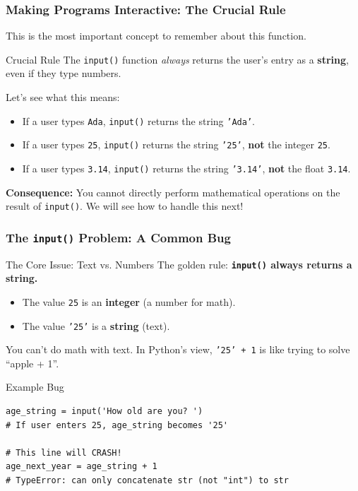 \documentclass{beamer}
\begin{document}
\begin{frame}[fragile]
    \frametitle{Making Programs Interactive: The Crucial Rule}

    This is the most important concept to remember about this function.

    \begin{alertblock}{Crucial Rule}
        The \texttt{input()} function \textit{always} returns the user's entry as a \textbf{string}, even if they type numbers.
    \end{alertblock}

    \vspace{1em}

    Let's see what this means:
    \begin{itemize}
        \item If a user types \texttt{Ada}, \texttt{input()} returns the string \texttt{'Ada'}.
        \item If a user types \texttt{25}, \texttt{input()} returns the string \texttt{'25'}, \textbf{not} the integer \texttt{25}.
        \item If a user types \texttt{3.14}, \texttt{input()} returns the string \texttt{'3.14'}, \textbf{not} the float \texttt{3.14}.
    \end{itemize}

    \vspace{1em}
    \textbf{Consequence:} You cannot directly perform mathematical operations on the result of \texttt{input()}. We will see how to handle this next!

\end{frame}

\begin{frame}[fragile]
    \frametitle{The \texttt{input()} Problem: A Common Bug}
    
    \begin{block}{The Core Issue: Text vs. Numbers}
        The golden rule: \textbf{\texttt{input()} always returns a string.}
        \begin{itemize}
            \item The value \texttt{25} is an \textbf{integer} (a number for math).
            \item The value \texttt{'25'} is a \textbf{string} (text).
        \end{itemize}
        You can't do math with text. In Python's view, \texttt{'25' + 1} is like trying to solve ``apple + 1''.
    \end{block}
    
    \begin{block}{Example Bug}
\begin{verbatim}
age_string = input('How old are you? ')
# If user enters 25, age_string becomes '25'

# This line will CRASH!
age_next_year = age_string + 1
# TypeError: can only concatenate str (not "int") to str
\end{verbatim}
    \end{block}

\end{frame}
\end{document}
